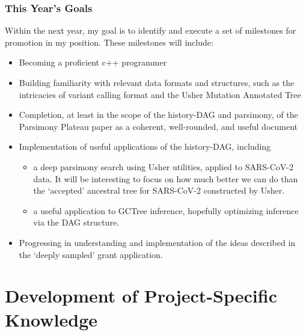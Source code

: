 \documentclass{paper}
\begin{document}
\subsubsection*{This Year's Goals}
Within the next year, my goal is to identify and execute a set of milestones for promotion in my position. These milestones will include:
\begin{itemize}
    \item Becoming a proficient c++ programmer
    \item Building familiarity with relevant data formats and structures, such as the intricacies of variant calling format and the Usher Mutation Annotated Tree
    \item Completion, at least in the scope of the history-DAG and parsimony, of the Parsimony Plateau paper as a coherent, well-rounded, and useful document
    \item Implementation of useful applications of the history-DAG, including
        \begin{itemize}
            \item a deep parsimony search using Usher utilities, applied to SARS-CoV-2 data.
                It will be interesting to focus on how much better we can do than the `accepted' ancestral tree for SARS-CoV-2 constructed by Usher.
            \item a useful application to GCTree inference, hopefully optimizing inference via the DAG structure.
        \end{itemize}
    \item Progressing in understanding and implementation of the ideas described in the `deeply sampled' grant application.
\end{itemize}

\section*{Development of Project-Specific Knowledge}
\end{document}
